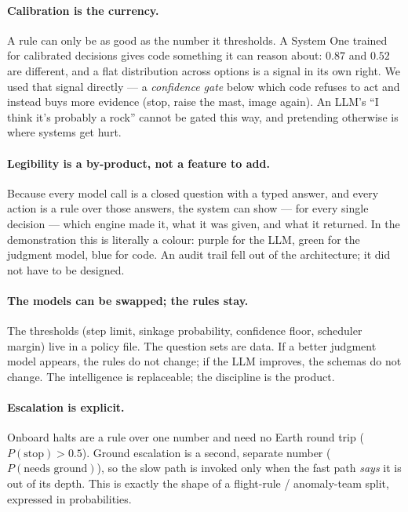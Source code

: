 \documentclass[11pt]{article}
\begin{document}
\paragraph{Calibration is the currency.} A rule can only be as good as the number it thresholds. A System One trained for calibrated decisions gives code something it can reason about: $0.87$ and $0.52$ are different, and a flat distribution across options is a signal in its own right. We used that signal directly --- a \emph{confidence gate} below which code refuses to act and instead buys more evidence (stop, raise the mast, image again). An LLM's ``I think it's probably a rock'' cannot be gated this way, and pretending otherwise is where systems get hurt.

\paragraph{Legibility is a by-product, not a feature to add.} Because every model call is a closed question with a typed answer, and every action is a rule over those answers, the system can show --- for every single decision --- which engine made it, what it was given, and what it returned. In the demonstration this is literally a colour: \textcolor{claude}{purple} for the LLM, \textcolor{jev}{green} for the judgment model, \textcolor{code}{blue} for code. An audit trail fell out of the architecture; it did not have to be designed.

\paragraph{The models can be swapped; the rules stay.} The thresholds (step limit, sinkage probability, confidence floor, scheduler margin) live in a policy file. The question sets are data. If a better judgment model appears, the rules do not change; if the LLM improves, the schemas do not change. The intelligence is replaceable; the discipline is the product.

\paragraph{Escalation is explicit.} Onboard halts are a rule over one number and need no Earth round trip ($P(\text{stop}) > 0.5$). Ground escalation is a second, separate number ($P(\text{needs ground})$), so the slow path is invoked only when the fast path \emph{says} it is out of its depth. This is exactly the shape of a flight-rule / anomaly-team split, expressed in probabilities.
\end{document}
